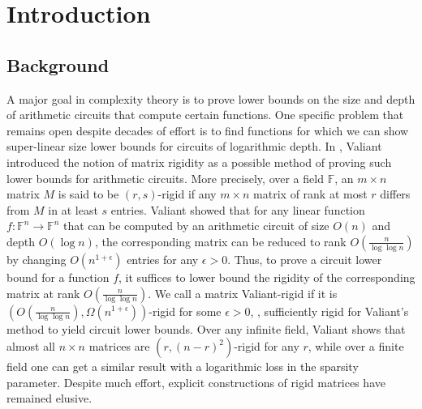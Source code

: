 \documentclass{toc}
\newcommand\F{{\mathbb{F}}}
\begin{document}
\begin{frontmatter}
%

\end{frontmatter}


%
\tableofcontents
%


%
%
%

\section{Introduction}

\subsection{Background}
A major goal in complexity theory is to prove lower bounds on the size and depth of arithmetic circuits that compute certain functions.  One specific problem that remains open despite decades of effort is to find functions for which we can show super-linear size lower bounds for circuits of logarithmic depth.  In \cite{rigidity}, Valiant introduced the notion of matrix rigidity as a possible method of proving such lower bounds for arithmetic circuits.  More precisely, over a field $\F$, an $m \times n$ matrix $M$  is said to be $(r,s)$-rigid if any $m \times n$ matrix of rank at most $r$ differs from $M$ in at least $s$ entries.  Valiant showed that for any linear function $f:\F^n \rightarrow \F^n$ that can be computed by an arithmetic circuit of size $O(n)$ and depth $O(\log n)$, the corresponding matrix can be reduced to rank $O(\frac{n}{\log \log n})$ by changing $O(n^{1+\epsilon})$ entries for any $\epsilon > 0$.  Thus, to prove a circuit lower bound for a function $f$, it suffices to lower bound the rigidity of the corresponding matrix at rank $O(\frac{n}{\log \log n})$.  We call a matrix Valiant-rigid if it is 
%
$\left( O(\frac{n}{\log \log n}), \Omega(n^{1+\epsilon}) \right)$-rigid
%
%
%
%
%
for some $\epsilon > 0$, \ie, sufficiently rigid for Valiant's method to yield circuit lower bounds. Over any infinite field, Valiant shows that almost all $n \times n$ matrices are $(r, (n-r)^2)$-rigid for any $r$, while over a finite field one can get a similar result with a logarithmic loss in the sparsity parameter.  Despite much effort,
explicit constructions of rigid matrices have remained elusive.  
\end{document}
